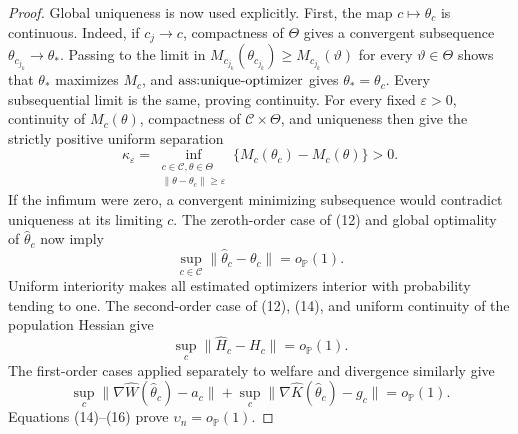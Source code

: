 \documentclass{article}
\begin{document}
\begin{proof}
Global uniqueness is now used explicitly. First, the map \(c\mapsto\theta_c\) is continuous. Indeed, if \(c_j\to c\), compactness of \(\Theta\) gives a convergent subsequence \(\theta_{c_{j_k}}\to\theta_*\). Passing to the limit in \(M_{c_{j_k}}(\theta_{c_{j_k}})\geq M_{c_{j_k}}(\vartheta)\) for every \(\vartheta\in\Theta\) shows that \(\theta_*\) maximizes \(M_c\), and \(\textnormal{ass:unique-optimizer}\) gives \(\theta_*=\theta_c\). Every subsequential limit is the same, proving continuity. For every fixed \(\varepsilon>0\), continuity of \(M_c(\theta)\), compactness of \(\mathcal C\times\Theta\), and uniqueness then give the strictly positive uniform separation
\[
 \kappa_\varepsilon
 =\inf_{\substack{c\in\mathcal C,\theta\in\Theta\\
                   \|\theta-\theta_c\|\geq\varepsilon}}
   \{M_c(\theta_c)-M_c(\theta)\}>0.
 \tag{13}
\]
If the infimum were zero, a convergent minimizing subsequence would contradict uniqueness at its limiting \(c\). The zeroth-order case of (12) and global optimality of \(\widehat\theta_c\) now imply
\[
 \sup_{c\in\mathcal C}\|\widehat\theta_c-\theta_c\|=o_{\mathbb P}(1).
 \tag{14}
\]
Uniform interiority makes all estimated optimizers interior with probability tending to one. The second-order case of (12), (14), and uniform continuity of the population Hessian give
\[
 \sup_c\|\widehat H_c-H_c\|=o_{\mathbb P}(1).
 \tag{15}
\]
The first-order cases applied separately to welfare and divergence similarly give
\[
 \sup_c\|\nabla\widehat W(\widehat\theta_c)-a_c\|
 +\sup_c\|\nabla\widehat K(\widehat\theta_c)-g_c\|=o_{\mathbb P}(1).
 \tag{16}
\]
Equations (14)--(16) prove \(\upsilon_n=o_{\mathbb P}(1)\).


\end{proof}
\end{document}
